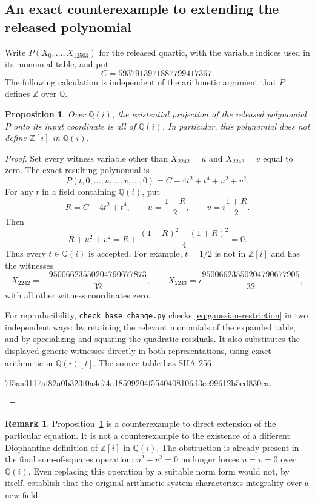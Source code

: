\documentclass[11pt]{article}
\newtheorem{proposition}[theorem]{Proposition}
\theoremstyle{definition}
\newtheorem{remark}[theorem]{Remark}
\begin{document}
\subsection{An exact counterexample to extending the released polynomial}

Write $P(X_0,\ldots,X_{12503})$ for the released quartic, with the variable
indices used in its monomial table, and put
\[
 C=5937913971887799417367.
\]
The following calculation is independent of the arithmetic argument that
$P$ defines $\mathbb Z$ over $\mathbb Q$.

\begin{proposition}\label{prop:quartic-gaussian}
Over $\mathbb Q(i)$, the existential projection of the released polynomial
$P$ onto its input coordinate is all of $\mathbb Q(i)$.  In particular,
this polynomial does not define $\mathbb Z[i]$ in $\mathbb Q(i)$.
\end{proposition}
\begin{proof}
Set every witness variable other than $X_{2242}=u$ and $X_{2243}=v$ equal
to zero.  The exact resulting polynomial is
\begin{equation}\label{eq:gaussian-restriction}
 P(t,0,\ldots,u,\ldots,v,\ldots,0)=C+4t^2+t^4+u^2+v^2.
\end{equation}
For any $t$ in a field containing $\mathbb Q(i)$, put
\[
 R=C+4t^2+t^4,\qquad u=\frac{1-R}{2},\qquad
 v=i\frac{1+R}{2}.
\]
Then
\[
 R+u^2+v^2
 =R+\frac{(1-R)^2-(1+R)^2}{4}=0.
\]
Thus every $t\in\mathbb Q(i)$ is accepted.  For example, $t=1/2$ is not
in $\mathbb Z[i]$ and has the witnesses
\[
 X_{2242}=-\frac{95006623550204790677873}{32},\qquad
 X_{2243}=i\frac{95006623550204790677905}{32},
\]
with all other witness coordinates zero.

For reproducibility, \texttt{check\_base\_change.py} checks
\eqref{eq:gaussian-restriction} in two independent ways: by retaining the
relevant monomials of the expanded table, and by specializing and squaring
the quadratic residuals.  It also substitutes the displayed generic
witnesses directly in both representations, using exact arithmetic in
$\mathbb Q(i)[t]$.  The source table has SHA-256
\begin{center}\small\ttfamily
7f5aa3117af82a0b323f0a4e74a18599204f5540408106d3ce99612b5ed830ca.
\end{center}
\end{proof}

\begin{remark}
Proposition~\ref{prop:quartic-gaussian} is a counterexample to direct
extension of the particular equation.  It is not a counterexample to
the existence of a different Diophantine definition of
$\mathbb Z[i]$ in $\mathbb Q(i)$.
The obstruction is already present in the final sum-of-squares operation:
$u^2+v^2=0$ no longer forces $u=v=0$ over $\mathbb Q(i)$.
Even replacing this operation by a suitable norm form would not, by
itself, establish that the original arithmetic system characterizes
integrality over a new field.
\end{remark}
\end{document}
